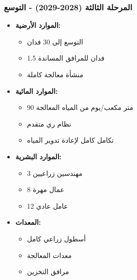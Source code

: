 \subsubsection{المرحلة الثالثة (2028-2029) - التوسع}
\begin{itemize}
    \item \textbf{الموارد الأرضية:}
    \begin{itemize}
        \item التوسع إلى 30 فدان
        \item 1.5 فدان للمرافق المساندة
        \item منشأة معالجة كاملة
    \end{itemize}
    \item \textbf{الموارد المائية:}
    \begin{itemize}
        \item 90 متر مكعب/يوم من المياه المعالجة
        \item نظام ري متقدم
        \item تكامل كامل لإعادة تدوير المياه
    \end{itemize}
    \item \textbf{الموارد البشرية:}
    \begin{itemize}
        \item 3 مهندسين زراعيين
        \item 8 عمال مهرة
        \item 12 عامل عادي
    \end{itemize}
    \item \textbf{المعدات:}
    \begin{itemize}
        \item أسطول زراعي كامل
        \item معدات المعالجة
        \item مرافق التخزين
    \end{itemize}
\end{itemize}

